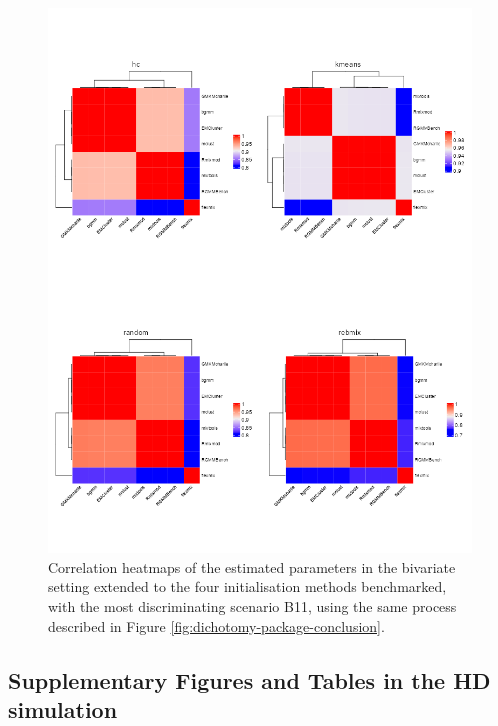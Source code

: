 \begin{figure}

{\centering \includegraphics[width=1\linewidth]{./figs/bivariate/heatmap_bivariate} 

}

\caption{Correlation heatmaps of the estimated parameters in the bivariate setting extended to the four initialisation methods benchmarked, with the most discriminating scenario B11, using the same process described in Figure \ref{fig:dichotomy-package-conclusion}.}\label{fig:heatmap-all-correlation-plots-bivariate}
\end{figure}

\hypertarget{supplementary-figures-and-tables-in-the-hd-simulation}{%
\subsection{Supplementary Figures and Tables in the HD simulation}\label{supplementary-figures-and-tables-in-the-hd-simulation}}

